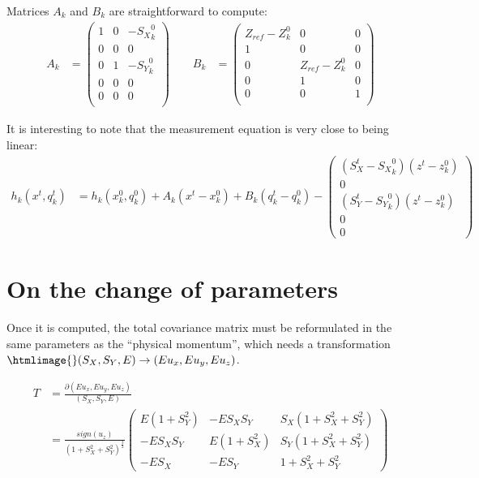 \documentclass[12pt,final]{article}
\begin{document}
Matrices $A_k$ and $B_k$ are straightforward to compute:
\begin{equation}
\begin{aligned}
A_k &=
\begin{pmatrix}
1 & 0 & -{S_X}^0_k\\
0 & 0 & 0\\
0 & 1 & -{S_Y}^0_k\\
0 & 0 & 0\\
0 & 0 & 0\\
\end{pmatrix}
\quad\quad
B_k &=
\begin{pmatrix}
Z_{ref} - Z^0_k & 0                & 0\\
1               & 0                & 0\\
0               & Z_{ref} - Z^0_k  & 0\\
0               & 1                & 0\\
0               & 0                & 1\\
\end{pmatrix}
\end{aligned}
\end{equation}

It is interesting to note that the measurement equation is very close to being linear:
\begin{equation}
\begin{aligned}
h_k(x^t,q^t_k) &= h_k(x^0_k,q^0_k) + A_k (x^t-x^0_k) + B_k (q^t_k-q^0_k) -
\begin{pmatrix}
(S^t_X-{S_X}^0_k)(z^t-z^0_k)\\
0\\
(S^t_Y-{S_Y}^0_k)(z^t-z^0_k)\\
0\\
0
\end{pmatrix}
\end{aligned}
\end{equation}

\section{On the change of parameters}
Once it is computed, the total covariance matrix must be reformulated in the same parameters as
the ``physical momentum'', which needs a transformation $\htmlimage{}(S_X,S_Y, E)\rightarrow(Eu_x,Eu_y,Eu_z)$.


\begin{equation}
\begin{aligned}
T &= \frac{\partial(Eu_x,Eu_y,Eu_z)}{(S_X,S_Y,E)} \\
&= \frac{sign(u_z)}{(1+S_X^2+S_Y^2)^{\frac{3}{2}}}
\begin{pmatrix}
E(1+S_Y^2)     & -ES_XS_Y     & S_X(1+S_X^2+S_Y^2) \\
-ES_XS_Y       & E(1+S_X^2)   & S_Y(1+S_X^2+S_Y^2) \\
-ES_X          & -ES_Y        & 1+S_X^2+S_Y^2
\end{pmatrix}
\end{aligned}
\end{equation}
\end{document}
